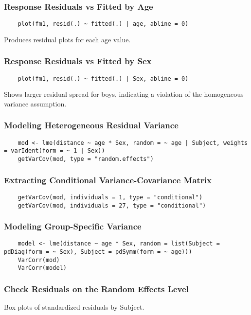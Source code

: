 \documentclass{beamer}
\begin{document}
\begin{frame}[fragile]
    \frametitle{Response Residuals vs Fitted by Age}
    \lstset{style=Rstyle}
    \begin{lstlisting}
    plot(fm1, resid(.) ~ fitted(.) | age, abline = 0)
    \end{lstlisting}
    Produces residual plots for each age value.
\end{frame}

\begin{frame}[fragile]
    \frametitle{Response Residuals vs Fitted by Sex}
    \lstset{style=Rstyle}
    \begin{lstlisting}
    plot(fm1, resid(.) ~ fitted(.) | Sex, abline = 0)
    \end{lstlisting}
    Shows larger residual spread for boys, indicating a violation of the homogeneous variance assumption.
\end{frame}

\begin{frame}[fragile]
    \frametitle{Modeling Heterogeneous Residual Variance}
    \lstset{style=Rstyle}
    \begin{lstlisting}
    mod <- lme(distance ~ age * Sex, random = ~ age | Subject, weights = varIdent(form = ~ 1 | Sex))
    getVarCov(mod, type = "random.effects")
    \end{lstlisting}
\end{frame}

\begin{frame}[fragile]
    \frametitle{Extracting Conditional Variance-Covariance Matrix}
    \lstset{style=Rstyle}
    \begin{lstlisting}
    getVarCov(mod, individuals = 1, type = "conditional")
    getVarCov(mod, individuals = 27, type = "conditional")
    \end{lstlisting}
\end{frame}

\begin{frame}[fragile]
    \frametitle{Modeling Group-Specific Variance}
    \lstset{style=Rstyle}
    \begin{lstlisting}
    model <- lme(distance ~ age * Sex, random = list(Subject = pdDiag(form = ~ Sex), Subject = pdSymm(form = ~ age)))
    VarCorr(mod)
    VarCorr(model)
    \end{lstlisting}
\end{frame}

\begin{frame}
    \frametitle{Check Residuals on the Random Effects Level}
    Box plots of standardized residuals by Subject.
\end{frame}
\end{document}
